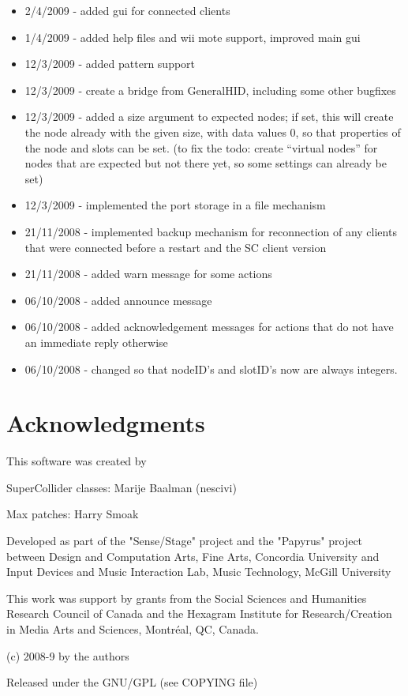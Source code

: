 \documentclass[letterpaper,10pt]{article}
\begin{document}
\begin{itemize}
 \item 2/4/2009 - added gui for connected clients
 \item 1/4/2009 - added help files and wii mote support, improved main gui
 \item 12/3/2009 - added pattern support
 \item 12/3/2009 - create a bridge from GeneralHID, including some other bugfixes
 \item 12/3/2009 - added a size argument to expected nodes; if set, this will create the node already with the given size, with data values 0, so that properties of the node and slots can be set. (to fix the todo: create ``virtual nodes'' for nodes that are expected but not there yet, so some settings can already be set)
 \item 12/3/2009 - implemented the port storage in a file mechanism
 \item 21/11/2008 - implemented backup mechanism for reconnection of any clients that were connected before a restart and the SC client version
 \item 21/11/2008 - added warn message for some actions
 \item 06/10/2008 - added announce message
 \item 06/10/2008 - added acknowledgement messages for actions that do not have an immediate reply otherwise
 \item 06/10/2008 - changed so that nodeID's and slotID's now are always integers.
\end{itemize}


\section*{Acknowledgments}\label{sec:acknowledgments}
This software was created by

SuperCollider classes:
Marije Baalman (nescivi)  

Max patches:
Harry Smoak


Developed as part of the "Sense/Stage" project and the "Papyrus" project between
Design and Computation Arts, Fine Arts, Concordia University
and
Input Devices and Music Interaction Lab, Music Technology, McGill University

This work was support by grants from the Social Sciences and Humanities Research Council of Canada and the Hexagram Institute for Research/Creation in Media Arts and Sciences, Montr\'eal, QC, Canada.

(c) 2008-9 by the authors

Released under the GNU/GPL (see COPYING file)
\end{document}
